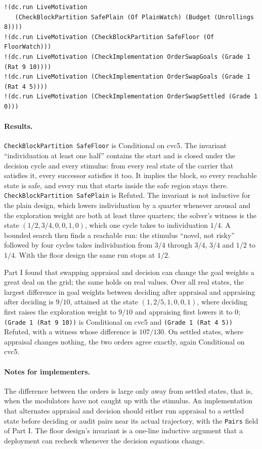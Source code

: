 \documentclass[11pt]{article}
\newcommand{\code}[1]{\texttt{#1}}
\theoremstyle{definition}
\theoremstyle{plain}
\begin{document}
\begin{lstlisting}[style=mettamod]
!(dc.run LiveMotivation
   (CheckBlockPartition SafePlain (Of PlainWatch) (Budget (Unrollings 8))))
!(dc.run LiveMotivation (CheckBlockPartition SafeFloor (Of FloorWatch)))
!(dc.run LiveMotivation (CheckImplementation OrderSwapGoals (Grade 1 (Rat 9 10))))
!(dc.run LiveMotivation (CheckImplementation OrderSwapGoals (Grade 1 (Rat 4 5))))
!(dc.run LiveMotivation (CheckImplementation OrderSwapSettled (Grade 1 0)))
\end{lstlisting}

\paragraph{Results.} \code{CheckBlockPartition SafeFloor} is Conditional on cvc5. The invariant
``individuation
at least one half'' contains the start and is closed under the decision cycle and every stimulus:
from every real state of the carrier that satisfies it, every successor satisfies it too. It implies
the block, so every reachable state is safe, and every run that starts inside the safe region stays
there. \code{CheckBlockPartition SafePlain} is Refuted. The invariant is not inductive for the plain
design, which lowers individuation by a quarter whenever arousal and the exploration weight are both
at least three quarters; the solver's witness is the state $(1/2,3/4,0,0,1,0)$, which one cycle
takes to individuation $1/4$. A bounded search then finds a reachable run: the stimulus ``novel, not
risky'' followed by four cycles takes individuation from $3/4$ through $3/4$, $3/4$ and $1/2$ to
$1/4$. With the floor design the same run stops at $1/2$.

Part I found that swapping appraisal and decision can change the goal weights a great deal on the
grid; the same holds on real values. Over all real states, the largest difference in goal weights
between deciding after appraisal and appraising after deciding is $9/10$, attained at the state
$(1,2/5,1,0,0,1)$, where deciding first raises the exploration weight to $9/10$ and appraising first
lowers it to $0$; \code{(Grade 1 (Rat 9 10))} is
Conditional on cvc5 and \code{(Grade 1 (Rat 4 5))} Refuted, with a witness whose difference is
$107/130$. On settled states, where appraisal changes nothing, the two orders agree exactly, again
Conditional on cvc5.

\paragraph{Notes for implementers.} The difference between the orders is large only away from
settled states, that is, when the modulators have not caught up with the stimulus. An implementation
that alternates appraisal and decision should either run appraisal to a settled state before
deciding or audit pairs near its actual trajectory, with the \code{Pairs} field of Part I. The floor
design's invariant is a one-line inductive argument that a deployment can recheck whenever the
decision equations change.
\end{document}
